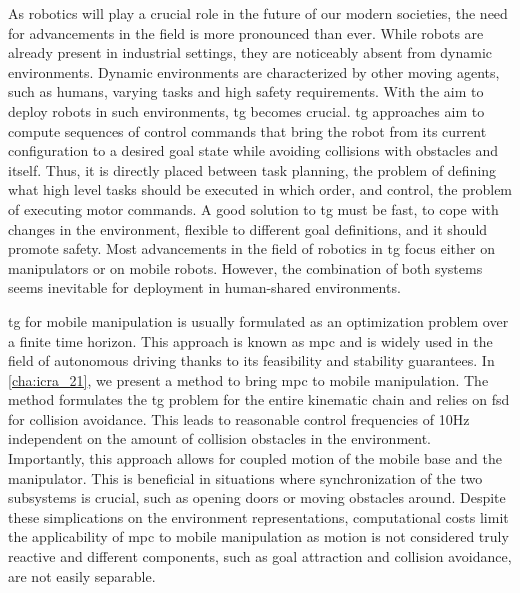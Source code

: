 \acresetall
As robotics will play a crucial role in the future of our
modern societies, the need for
advancements in the field is more pronounced than ever.
While robots are already present in industrial settings,
they are noticeably absent from dynamic environments.
Dynamic environments are characterized by other moving agents, 
such as humans, varying tasks and high safety requirements.
With the aim to deploy robots in such environments, \ac{tg} becomes crucial.
\Ac{tg} approaches aim to compute sequences
of control commands that bring the robot from its current
configuration to a desired goal state while avoiding
collisions with obstacles and itself. Thus, it is directly placed between 
task planning, the problem of defining what high level tasks should be executed
in which order, and control, the problem of executing motor commands.
A good solution to \ac{tg} must be fast, to cope with changes in the
environment, flexible to different goal definitions, and it should promote safety.
Most advancements in the field of robotics in \ac{tg} focus either on
manipulators or on mobile robots. However, the combination of both
systems seems inevitable for deployment in human-shared environments.

\Ac{tg} for mobile manipulation is usually formulated as an
optimization problem over a finite time horizon. This approach is known as
\ac{mpc} and is widely used in the field of autonomous driving thanks to its
feasibility and stability guarantees. In \cref{cha:icra_21}, we present a method
to bring \ac{mpc} to mobile manipulation. The method formulates the \ac{tg}
problem for the entire kinematic chain and relies on \ac{fsd} for collision
avoidance. This leads to reasonable control frequencies of 10Hz independent on
the amount of collision obstacles in the environment. Importantly, this approach
allows for coupled motion of the mobile base and the manipulator. This is
beneficial in situations where synchronization of the two subsystems is crucial,
such as opening doors or moving obstacles around.
Despite these simplications on the environment representations, computational costs
limit the applicability of \ac{mpc} to mobile manipulation as motion is not
considered truly reactive and different components, such as goal attraction and
collision avoidance, are not easily separable.

